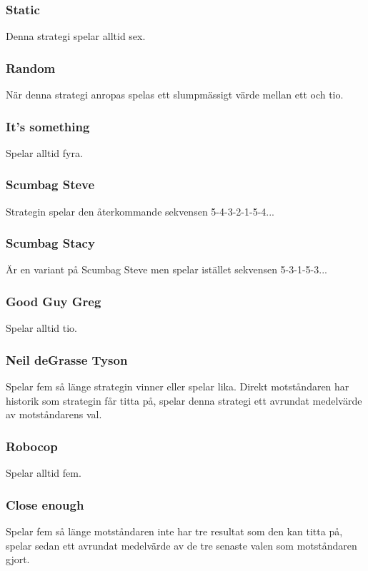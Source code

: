 \subsubsection{Static}
Denna strategi spelar alltid sex.

\subsubsection{Random}
När denna strategi anropas spelas ett slumpmässigt värde mellan ett och tio.

\subsubsection{It’s something}
Spelar alltid fyra.

\subsubsection{Scumbag Steve}
Strategin spelar den återkommande sekvensen 5-4-3-2-1-5-4...

\subsubsection{Scumbag Stacy}
Är en variant på Scumbag Steve men spelar istället sekvensen 5-3-1-5-3...

\subsubsection{Good Guy Greg}
Spelar alltid tio.

\subsubsection{Neil deGrasse Tyson}
Spelar fem så länge strategin vinner eller spelar lika. Direkt motståndaren har historik som strategin får titta på, spelar denna strategi ett avrundat medelvärde av motståndarens val.

\subsubsection{Robocop}
Spelar alltid fem.

\subsubsection{Close enough}
Spelar fem så länge motståndaren inte har tre resultat som den kan titta på, spelar sedan ett avrundat medelvärde av de tre senaste valen som motståndaren gjort.

